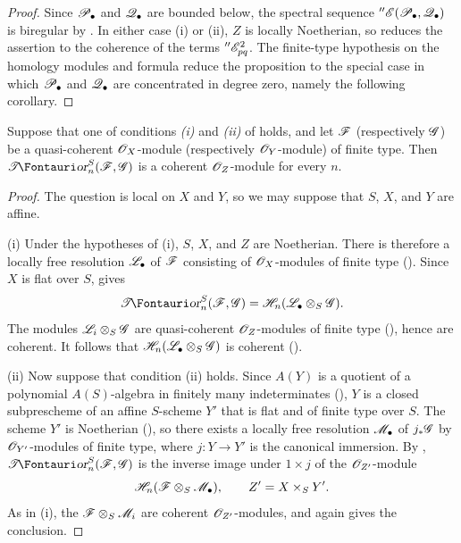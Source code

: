 \begin{proof}
Since $\mathscr{P}_\bullet$ and $\mathscr{Q}_\bullet$ are bounded below, the
spectral sequence
$''\mathscr{E}(\mathscr{P}_\bullet,\mathscr{Q}_\bullet)$ is biregular by
.  In either case (i) or (ii), $Z$ is locally
Noetherian, so  reduces the assertion to the
coherence of the terms $''\mathscr{E}_{pq}^2$.  The finite-type
hypothesis on the homology modules and formula
 reduce the proposition to the special case in
which $\mathscr{P}_\bullet$ and $\mathscr{Q}_\bullet$ are concentrated in
degree zero, namely the following corollary.
\end{proof}

\begin{corollary}[6.5.14]
\label{III.6.5.14}
Suppose that one of conditions \emph{(i)} and \emph{(ii)} of
 holds, and let $\mathscr{F}$ (respectively $\mathscr{G}$)
be a quasi-coherent $\mathscr{O}_X$-module (respectively
$\mathscr{O}_Y$-module) of finite type.  Then
$\shTor_n^S(\sh F,\sh G)$ is a coherent $\mathscr{O}_Z$-module for
every $n$.
\end{corollary}

\begin{proof}
The question is local on $X$ and $Y$, so we may suppose that
$S$, $X$, and $Y$ are affine.

\textnormal{(i)} Under the hypotheses of (i), $S$, $X$, and $Z$
are Noetherian.  There is therefore a locally free resolution
$\mathscr{L}_\bullet$ of $\mathscr{F}$ consisting of $\mathscr{O}_X$-modules of
finite type ().  Since $X$ is flat over $S$,
 gives
\[
  \shTor_n^S(\sh F,\sh G)
  =
  \sh H_n(\sh L_\bullet\otimes_S\sh G).
\]
The modules $\mathscr{L}_i\otimes_S\mathscr{G}$ are quasi-coherent
$\mathscr{O}_Z$-modules of finite type (), hence are
coherent.  It follows that
$\mathscr{H}_n(\mathscr{L}_\bullet\otimes_S\mathscr{G})$ is coherent
().

\textnormal{(ii)} Now suppose that condition (ii) holds.  Since
$A(Y)$ is a quotient of a polynomial $A(S)$-algebra in finitely
many indeterminates (), $Y$ is a closed
subprescheme of an affine $S$-scheme $Y'$ that is flat and of
finite type over $S$.  The scheme $Y'$ is Noetherian
(), so there exists a locally free resolution
$\mathscr{M}_\bullet$ of $j_*\mathscr{G}$ by $\mathscr{O}_{Y'}$-modules of finite
type, where $j:Y\to Y'$ is the canonical immersion.  By
, $\shTor_n^S(\sh F,\sh G)$ is the inverse image
under $1\times j$ of the $\mathscr{O}_{Z'}$-module
\[
  \mathscr{H}_n(\mathscr{F}\otimes_S\mathscr{M}_\bullet),
  \qquad Z'=X\times_SY'.
\]
As in (i), the $\mathscr{F}\otimes_S\mathscr{M}_i$ are coherent
$\mathscr{O}_{Z'}$-modules, and  again gives the
conclusion.
\end{proof}

